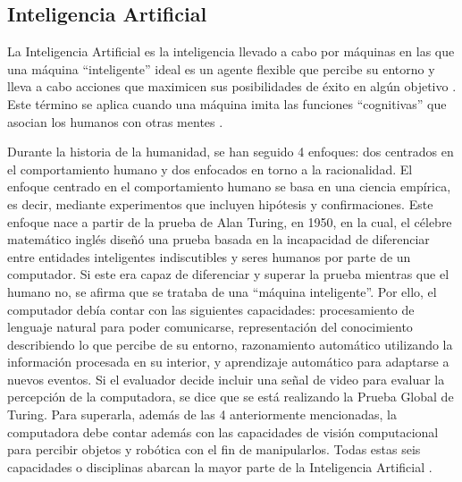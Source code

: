 \subsection{Inteligencia Artificial}

La Inteligencia Artificial es la inteligencia llevado a cabo por máquinas en las que una máquina “inteligente” ideal es un agente flexible que percibe su entorno y lleva a cabo acciones que maximicen sus posibilidades de éxito en algún objetivo \parencite{tec_poole1998machinelearning}. Este término se aplica cuando una máquina imita las funciones “cognitivas” que asocian los humanos con otras mentes \parencite{bk_russell2009intart}.

Durante la historia de la humanidad, se han seguido 4 enfoques: dos centrados en el comportamiento humano y dos enfocados en torno a la racionalidad. El enfoque centrado en el comportamiento humano se basa en una ciencia empírica, es decir, mediante experimentos que incluyen hipótesis y confirmaciones. Este enfoque nace a partir de la prueba de Alan Turing, en 1950, en la cual, el célebre matemático inglés diseñó una prueba basada en la incapacidad de diferenciar entre entidades inteligentes indiscutibles y seres humanos por parte de un computador. Si este era capaz de diferenciar y superar la prueba mientras que el humano no, se afirma que se trataba de una “máquina inteligente”. Por ello, el computador debía contar con las siguientes capacidades: procesamiento de lenguaje natural para poder comunicarse, representación del conocimiento describiendo lo que percibe de su entorno, razonamiento automático utilizando la información procesada en su interior, y aprendizaje automático para adaptarse a nuevos eventos. Si el evaluador decide incluir una señal de video para evaluar la percepción de la computadora, se dice que se está realizando la Prueba Global de Turing. Para superarla, además de las 4 anteriormente mencionadas, la computadora debe contar además con las capacidades de visión computacional para percibir objetos y robótica con el fin de manipularlos. Todas estas seis capacidades o disciplinas abarcan la mayor parte de la Inteligencia Artificial \parencite{bk_russell2004intart}.

